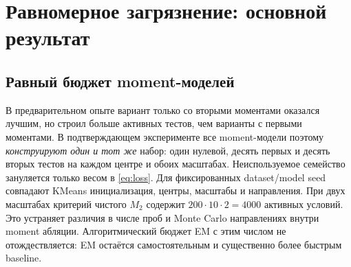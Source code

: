 \documentclass[11pt,a4paper]{article}
\newcommand{\Mtwo}{M_2}
\begin{document}
\section{Равномерное загрязнение: основной результат}

\subsection{Равный бюджет moment-моделей}

В предварительном опыте вариант только со вторыми моментами оказался лучшим,
но строил больше активных тестов, чем варианты с первыми моментами. В
подтверждающем эксперименте все moment-модели поэтому \emph{конструируют один
и тот же} набор: один нулевой, десять первых и десять вторых тестов на каждом
центре и обоих масштабах. Неиспользуемое семейство зануляется только весом в
\eqref{eq:loss}. Для фиксированных dataset/model seed совпадают KMeans
инициализация, центры, масштабы и направления. При двух масштабах критерий
чистого $\Mtwo$ содержит $200\cdot10\cdot2=4000$ активных условий. Это
устраняет различия в числе проб и Monte Carlo направлениях внутри moment
абляции. Алгоритмический бюджет EM с этим числом не отождествляется: EM
остаётся самостоятельным и существенно более быстрым baseline.
\end{document}
